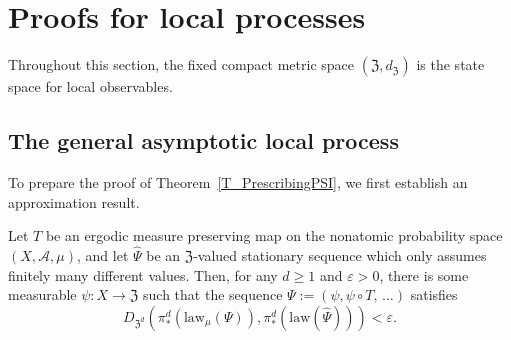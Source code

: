 \documentclass[AHL,Unicode,longabstracts]{cedram}
\newcommand{\clA}{\mathcal{A}}
\newcommand{\law}{\mathrm{law}}
\newcommand{\frkZ}{\mathfrak{Z}}
\begin{document}
\section{Proofs for local processes}\label{Sec_PfInternalStates}

Throughout this section, the fixed compact metric space $(\frkZ,d_{\frkZ})$ is the state space for local observables.


\subsection{The general asymptotic local process}
To prepare the proof of Theorem~\ref{T_PrescribingPSI}, we first establish an approximation result.

\begin{prop}\label{P_ApproxMarginals}
Let $T$ be an ergodic measure preserving map on the nonatomic probability space $(X,\clA,\mu)$, and let $\widehat{\Psi}$ be an $\frkZ$-valued stationary sequence which only assumes finitely many different values. Then, for any $d\geq1$ and $\varepsilon>0$, there is some measurable $\psi:X\rightarrow\frkZ$ such that the sequence $\Psi:=(\psi,\psi\circ T,\,\ldots)$ satisfies
\begin{equation}
D_{\frkZ^{d}}\left(\pi_{\ast}^{d}\left(\law_{\mu}(\Psi)\right),\pi_{\ast} ^{d}\left(\law\left(\widehat{\Psi}\right)\right)\right)<\varepsilon.
\end{equation}
\end{prop}
\end{document}
